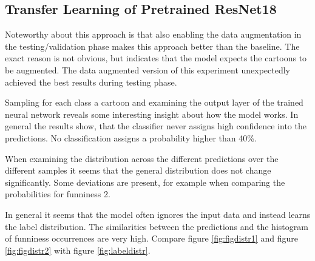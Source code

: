 \documentclass[draft,final,oneside]{vutinfth} %
\begin{document}
\subsection{Transfer Learning of Pretrained ResNet18}
Noteworthy about this approach is that also enabling the data augmentation in the testing/validation phase makes this approach better than the baseline. The exact reason is not obvious, but indicates that the model expects the cartoons to be augmented. The data augmented version of this experiment unexpectedly achieved the best results during testing phase.

Sampling for each class a cartoon and examining the output layer of the trained neural network reveals some interesting insight about how the model works. In general the results show, that the classifier never assigns high confidence into the predictions. No classification assigns a probability higher than 40\%.

When examining the distribution across the different predictions over the different samples it seems that the general distribution does not change significantly. Some deviations are present, for example when comparing the probabilities for funniness 2.

In general it seems that the model often ignores the input data and instead learns the label distribution. The similarities between the predictions and the histogram of funniness occurrences are very high. Compare figure \ref{fig:figdistr1} and figure \ref{fig:figdistr2} with figure \ref{fig:labeldistr}.
\end{document}
